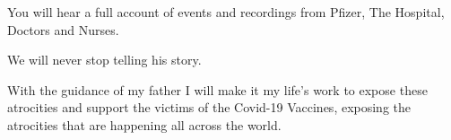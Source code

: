 You will hear a full account of events and recordings from Pfizer, The Hospital,
Doctors and Nurses.

We will never stop telling his story.

With the guidance of my father I will make it my life’s work to expose these
atrocities and support the victims of the Covid-19 Vaccines, exposing the
atrocities that are happening all across the world.

